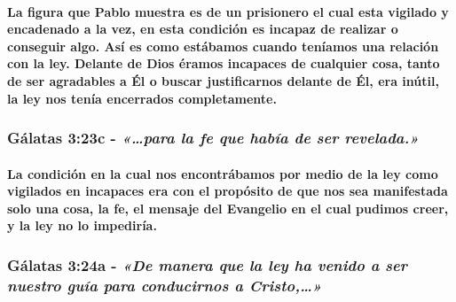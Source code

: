 \documentclass[11a pt,twoside]{article}
\newcommand{\scripture}[1]{%
  {\fontsize{12pt}{16pt}\selectfont\ScriptureFont\itshape #1}%
}
\let\oldsubsubsection\subsubsection
\renewcommand{\subsubsection}{\needspace{4\baselineskip}\oldsubsubsection}
\let\oldparagraph\paragraph
\renewcommand{\paragraph}{\needspace{3\baselineskip}\oldparagraph}
\begin{document}
\paragraph{La figura que Pablo muestra es de un prisionero el cual esta
vigilado y encadenado a la vez, en esta condición es incapaz de realizar
o conseguir algo. Así es como estábamos cuando teníamos una relación con
la ley. Delante de Dios éramos incapaces de cualquier cosa, tanto de ser
agradables a Él o buscar justificarnos delante de Él, era inútil, la ley
nos tenía encerrados
completamente.}\label{la-figura-que-pablo-muestra-es-de-un-prisionero-el-cual-esta-vigilado-y-encadenado-a-la-vez-en-esta-condiciuxf3n-es-incapaz-de-realizar-o-conseguir-algo.-asuxed-es-como-estuxe1bamos-cuando-tenuxedamos-una-relaciuxf3n-con-la-ley.-delante-de-dios-uxe9ramos-incapaces-de-cualquier-cosa-tanto-de-ser-agradables-a-uxe9l-o-buscar-justificarnos-delante-de-uxe9l-era-inuxfatil-la-ley-nos-tenuxeda-encerrados-completamente.}

\subsubsection{\texorpdfstring{Gálatas 3:23c -
\scripture{«…para la fe que había de ser revelada.»}}{Gálatas 3:23c - }}\label{guxe1latas-323c---para-la-fe-que-habuxeda-de-ser-revelada.}

\paragraph{La condición en la cual nos encontrábamos por medio de la ley
como vigilados en incapaces era con el propósito de que nos sea
manifestada solo una cosa, la fe, el mensaje del Evangelio en el cual
pudimos creer, y la ley no lo
impediría.}\label{la-condiciuxf3n-en-la-cual-nos-encontruxe1bamos-por-medio-de-la-ley-como-vigilados-en-incapaces-era-con-el-propuxf3sito-de-que-nos-sea-manifestada-solo-una-cosa-la-fe-el-mensaje-del-evangelio-en-el-cual-pudimos-creer-y-la-ley-no-lo-impediruxeda.}

\subsubsection{\texorpdfstring{Gálatas 3:24a -
\scripture{«De manera que la ley ha venido a ser nuestro guía para conducirnos a Cristo,…»}}{Gálatas 3:24a - }}\label{guxe1latas-324a---de-manera-que-la-ley-ha-venido-a-ser-nuestro-guuxeda-para-conducirnos-a-cristo}
\end{document}
